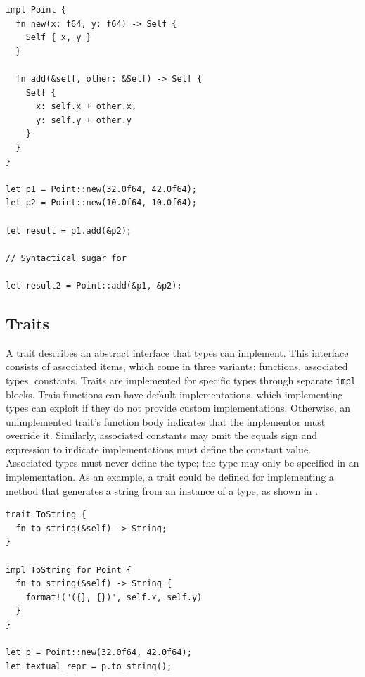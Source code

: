 \documentclass[paper=a4,%
  twoside,%
  BCOR4mm,%
  abstract=true,%
  toc=bibliography,%
  chapterprefix=true,%
  toc=bibliographynumbered,%
  open=right,%
  english,%
  pagesize=pdftex]{scrreprt}
\begin{document}
\begin{lstlisting}[style=boxed, caption={Defining a method on \texttt{Point} data type from \Cref{lst:example-struct-enum}}, label=lst:example-method]
impl Point {
  fn new(x: f64, y: f64) -> Self {
    Self { x, y }
  }

  fn add(&self, other: &Self) -> Self {
    Self {
      x: self.x + other.x,
      y: self.y + other.y
    }
  }
}

let p1 = Point::new(32.0f64, 42.0f64);
let p2 = Point::new(10.0f64, 10.0f64);

let result = p1.add(&p2);

// Syntactical sugar for 

let result2 = Point::add(&p1, &p2);
\end{lstlisting}


\subsection{Traits}
A trait describes an abstract interface that types can implement. This interface consists of associated items, which come in three variants: functions, associated types, constants. Traits are implemented for specific types through separate \texttt{impl} blocks. Trais functions can have default implementations, which implementing types can exploit if they do not provide custom implementations. Otherwise, an unimplemented trait's function body indicates that the implementor must override it. Similarly, associated constants may omit the equals sign and expression to indicate implementations must define the constant value. Associated types must never define the type; the type may only be specified in an implementation. As an example, a trait could be defined for implementing a method that generates a string from an instance of a type, as shown in .

\begin{lstlisting}[style=boxed, caption={Trait definition and implementation for the \texttt{Point} data type from \Cref{lst:example-struct-enum}}, label=lst:example-trait]
trait ToString {
  fn to_string(&self) -> String;
}

impl ToString for Point {
  fn to_string(&self) -> String {
    format!("({}, {})", self.x, self.y)
  }
}

let p = Point::new(32.0f64, 42.0f64);
let textual_repr = p.to_string();
\end{lstlisting}

\end{document}

